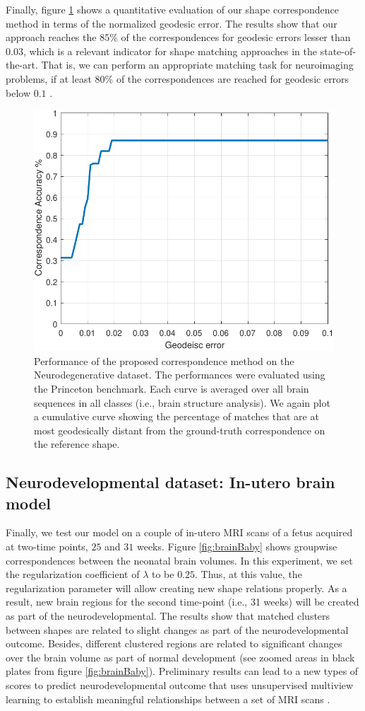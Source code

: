 \documentclass[]{article}
\begin{document}
Finally, figure \ref{fig:ch4:geoerrBrain} shows a quantitative evaluation of our shape correspondence method in terms of the normalized geodesic error. The results show that our approach reaches the $85\%$ of the correspondences for geodesic errors lesser than $0.03$, which is a relevant indicator for shape matching approaches in the state-of-the-art. That is, we can perform an appropriate matching task for neuroimaging problems, if at least $80\%$ of the correspondences are reached for geodesic errors below $ 0.1$ \cite{SHREC16}.



\begin{figure}[ht!]
	\centering
	
	\includegraphics[width=0.6\linewidth]{img/geoErrBrain}
	\caption{Performance of the proposed correspondence method on the Neurodegenerative dataset. The performances were evaluated using the Princeton benchmark. Each curve is averaged over all brain sequences in all classes (i.e., brain structure analysis). We again plot a cumulative curve showing the percentage of matches that are at most geodesically distant from the ground-truth correspondence on the reference shape.}
	\label{fig:ch4:geoerrBrain}
\end{figure}


\subsection{Neurodevelopmental dataset: In-utero brain model}

Finally, we test our model on a couple of in-utero MRI scans of a fetus acquired at two-time points, $25$ and $31$ weeks. Figure \ref{fig:brainBaby} shows groupwise correspondences between the neonatal brain volumes. In this experiment, we set the regularization coefficient of $\lambda$ to be $0.25$. Thus, at this value, the regularization parameter will allow creating new shape relations properly. As a result, new brain regions for the second time-point (i.e., 31 weeks) will be created as part of the neurodevelopmental. The results show that matched clusters between shapes are related to slight changes as part of the neurodevelopmental outcome. Besides, different clustered regions are related to significant changes over the brain volume as part of normal development (see zoomed areas in black plates from figure \ref{fig:brainBaby}). Preliminary results can lead to a new types of scores to predict neurodevelopmental outcome that uses unsupervised multiview learning to establish meaningful relationships between a set of MRI scans \cite{NeuroBaby18}. 
\end{document}
